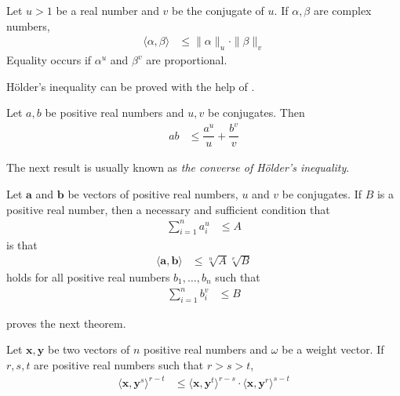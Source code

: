 \documentclass[inequalities.tex]{subfile}
\begin{document}
		\begin{theorem}
			Let $u>1$ be a real number and $v$ be the conjugate of $u$. If $\alpha,\beta$ are complex numbers,
				\begin{align*}
					\langle\alpha,\beta\rangle
						& \leq \|\alpha\|_{u}\cdot\|\beta\|_{v}
				\end{align*}
			Equality occurs if $\alpha^{u}$ and $\beta^{v}$ are proportional.
		\end{theorem}
	H\"{o}lder's inequality can be proved with the help of \textcite{young_1912}.
		\begin{theorem}
			Let $a,b$ be positive real numbers and $u,v$ be conjugates. Then
				\begin{align*}
					ab
						& \leq \dfrac{a^{u}}{u}+\dfrac{b^{v}}{v}
				\end{align*}
		\end{theorem}
	The next result is usually known as \textit{the converse of H\"{o}lder's inequality}.
		\begin{theorem}
			Let $\mathbf{a}$ and $\mathbf{b}$ be vectors of positive real numbers, $u$ and $v$ be conjugates.  If $B$ is a positive real number, then a necessary and sufficient condition that
				\begin{align*}
					\sum_{i=1}^{n}a_{i}^{u}
						& \leq A
				\end{align*}
			is that
				\begin{align*}
					\langle\mathbf{a},\mathbf{b}\rangle
						& \leq \sqrt[u]{A}\sqrt[v]{B}
				\end{align*}
			holds for all positive real numbers $b_{1},\ldots,b_{n}$ such that
				\begin{align*}
					\sum_{i=1}^{n}b_{i}^{v}
						& \leq B
				\end{align*}
		\end{theorem}
	\textcite{Ljapu_1901} proves the next theorem.
		\begin{theorem}
			Let $\mathbf{x},\mathbf{y}$ be two vectors of $n$ positive real numbers and $\omega$ be a weight vector. If $r,s,t$ are positive real numbers such that $r>s>t$,
				\begin{align*}
					\langle\mathbf{x},\mathbf{y}^{s}\rangle^{r-t}
						& \leq \langle\mathbf{x},\mathbf{y}^{t}\rangle^{r-s}\cdot\langle\mathbf{x},\mathbf{y}^{r}\rangle^{s-t}
				\end{align*}
		\end{theorem}
\end{document}
